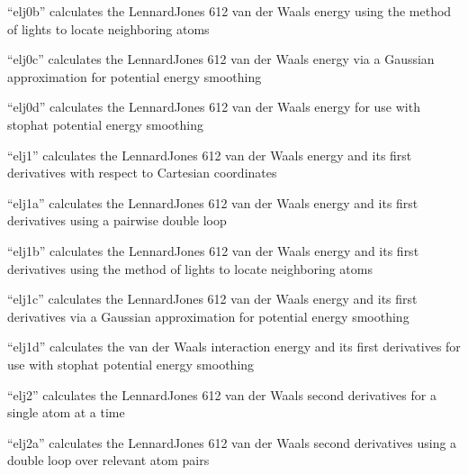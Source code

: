 \documentclass[letterpaper,11pt,english]{sphinxmanual}
\begin{document}
“elj0b” calculates the Lennard\sphinxhyphen{}Jones 6\sphinxhyphen{}12 van der Waals energy using the method of lights to locate neighboring atoms


“elj0c” calculates the Lennard\sphinxhyphen{}Jones 6\sphinxhyphen{}12 van der Waals energy via a Gaussian approximation for potential energy smoothing


“elj0d” calculates the Lennard\sphinxhyphen{}Jones 6\sphinxhyphen{}12 van der Waals energy for use with stophat potential energy smoothing


“elj1” calculates the Lennard\sphinxhyphen{}Jones 6\sphinxhyphen{}12 van der Waals energy and its first derivatives with respect to Cartesian coordinates


“elj1a” calculates the Lennard\sphinxhyphen{}Jones 6\sphinxhyphen{}12 van der Waals energy and its first derivatives using a pairwise double loop


“elj1b” calculates the Lennard\sphinxhyphen{}Jones 6\sphinxhyphen{}12 van der Waals energy and its first derivatives using the method of lights to locate neighboring atoms


“elj1c” calculates the Lennard\sphinxhyphen{}Jones 6\sphinxhyphen{}12 van der Waals energy  and its first derivatives via a Gaussian approximation for  potential energy smoothing


“elj1d” calculates the van der Waals interaction energy and its first derivatives for use with stophat potential energy smoothing


“elj2” calculates the Lennard\sphinxhyphen{}Jones 6\sphinxhyphen{}12 van der Waals second derivatives for a single atom at a time


“elj2a” calculates the Lennard\sphinxhyphen{}Jones 6\sphinxhyphen{}12 van der Waals second derivatives using a double loop over relevant atom pairs
\end{document}
